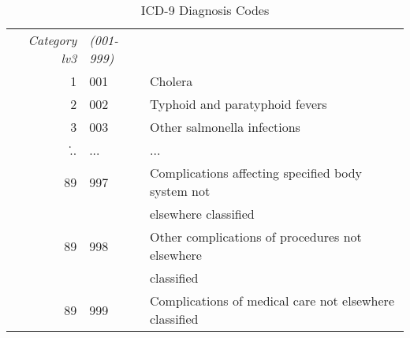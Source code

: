 \begin{table}[h!]
\begin{tabular}{|rll|}
		\hline	
		\textit{Category lv3}&\textit{(001-999)}&\\
		
		1 &001 &Cholera\\
		2 &002 &Typhoid and paratyphoid fevers\\
		3 &003 &Other salmonella infections\\
		\...&...&...\\
		89&997 &Complications affecting specified body system not \\
		&& elsewhere classified\\
		89&998 &Other complications of procedures not elsewhere \\
		&&classified\\
		89&999 &Complications of medical care not elsewhere classified\\

		\hline

	\end{tabular}
	\caption{ICD-9 Diagnosis Codes}
	\label{fig:icd10table}
\end{table}


